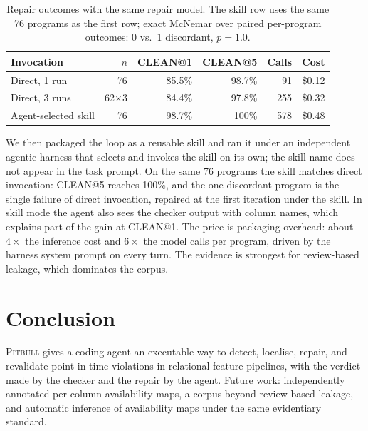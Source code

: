\documentclass[letterpaper]{article} %
\begin{document}
\begin{table}[t]
\centering\footnotesize
\setlength{\tabcolsep}{2pt}
\begin{tabular}{@{}lrrrrr@{}}
\toprule
Invocation & $n$ & CLEAN@1 & CLEAN@5 & Calls & Cost \\
\midrule
Direct, 1 run        & 76          & 85.5\% & 98.7\% & 91  & \$0.12 \\
Direct, 3 runs       & 62$\times$3 & 84.4\% & 97.8\% & 255 & \$0.32 \\
Agent-selected skill & 76          & 98.7\% & 100\%  & 578 & \$0.48 \\
\bottomrule
\end{tabular}
\caption{Repair outcomes with the same repair model. The skill row uses the
same 76 programs as the first row; exact McNemar over paired per-program
outcomes: 0 vs.\ 1 discordant, $p = 1.0$.}
\label{tab:results}
\end{table}

We then packaged the loop as a reusable skill and ran it under an
independent agentic harness that selects and invokes the skill on its own;
the skill name does not appear in the task prompt. On the same 76 programs
the skill matches direct invocation: CLEAN@5 reaches 100\%, and the one
discordant program is the single failure of direct invocation, repaired at
the first iteration under the skill. In skill mode the agent also sees the
checker output with column names, which explains part of the gain at
CLEAN@1. The price is packaging overhead: about $4\times$ the inference cost
and $6\times$ the model calls per program, driven by the harness system
prompt on every turn. The evidence is strongest for review-based leakage,
which dominates the corpus.

\section{Conclusion}

\textsc{Pitbull} gives a coding agent an executable way to detect, localise,
repair, and revalidate point-in-time violations in relational feature
pipelines, with the verdict made by the checker and the repair by the agent.
Future work: independently annotated per-column availability maps, a corpus
beyond review-based leakage, and automatic inference of availability maps
under the same evidentiary standard.


\end{document}
